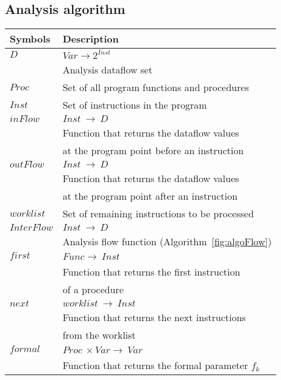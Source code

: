 \subsection{Analysis algorithm} 
\begin{table}
\begin{tabular}{|l|l|}
\hline
\textbf{Symbols}				&	\textbf{Description}								\\ \hline
$\mathit{D}$					&	$\mathit{Var} \rightarrow 2^\mathit{Inst}$			\\
								&	Analysis dataflow set 								\\ \hline
$\mathit{Proc}$					&	Set of all program functions and procedures 		\\ \hline
$\mathit{Inst}$					&	Set of instructions in the program 					\\ \hline
$\mathit{inFlow}$				&	$\mathit{Inst}\ \rightarrow\ \mathit{D}$ 			\\
								&	Function that returns the dataflow values			\\
		    					&	at the program point before an instruction 			\\ 	\hline
$\mathit{outFlow}$				&	$\mathit{Inst}\ \rightarrow\ \mathit{D}$ 			\\
								&	Function that returns the dataflow values			\\
		    					&	at the program point after an instruction 			\\ 	\hline	    		
$\mathit{worklist}$				&	Set of remaining instructions to be processed 		\\ \hline
$\mathit{InterFlow}$					&	$\mathit{Inst}\ \rightarrow\ \mathit{D}$ 			\\
								&   Analysis flow function (Algorithm~\ref{fig:algoFlow}) 			\\ \hline
$\mathit{first}$				&	$\mathit{Func} \rightarrow\ \mathit{Inst}$ 			\\
								& 	Function that returns the first instruction			\\
								&	of a procedure										\\ \hline
$\mathit{next}$					&	$\mathit{worklist}\ \rightarrow\ \mathit{Inst}$ 	\\
								& 	Function that returns the next instructions			\\
								&	from the worklist									\\ \hline
$\mathit{formal}$				&	$\mathit{Proc}\ \times \mathit{Var} \rightarrow\ \mathit{Var}$ 	\\
								& 	Function that returns the formal parameter $f_k$	\\

\end{tabular}
\end{table}
